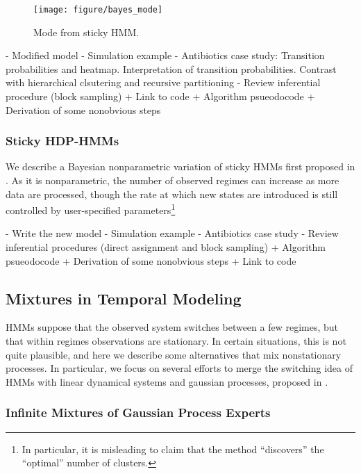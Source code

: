 \documentclass{article}
\begin{document}
\begin{figure}[ht]
  \centering
  \texttt{[image: figure/bayes\_mode]}
  \caption{Mode from sticky HMM. \label{fig:bayes_mode} }
\end{figure}

- Modified model
- Simulation example
- Antibiotics case study: Transition probabilities and heatmap. Interpretation
of transition probabilities. Contrast with hierarchical clsutering and recursive
partitioning
- Review inferential procedure (block sampling)
  + Link to code
  + Algorithm psueodocode
  + Derivation of some nonobvious steps

\subsubsection{Sticky HDP-HMMs}

We describe a Bayesian nonparametric variation of sticky HMMs first proposed in
\citep{fox2008hdp}. As it is nonparametric, the number of observed regimes can
increase as more data are processed, though the rate at which new states are
introduced is still controlled by user-specified parameters\footnote{In
  particular, it is misleading to claim that the method ``discovers'' the
  ``optimal'' number of clusters.}

- Write the new model
- Simulation example
- Antibiotics case study
- Review inferential procedures (direct assignment and block sampling)
  + Algorithm psueodocode
  + Derivation of some nonobvious steps
  + Link to code

\subsection{Mixtures in Temporal Modeling}

HMMs suppose that the observed system switches between a few regimes, but that
within regimes observations are stationary. In certain situations, this is not
quite plausible, and here we describe some alternatives that mix nonstationary
processes. In particular, we focus on several efforts to merge the switching idea of
HMMs with linear dynamical systems and gaussian processes, proposed in
\citep{ghahramani1998variational, rasmussen2002infinite, fox2012multiresolution}.


\subsubsection{Infinite Mixtures of Gaussian Process Experts}
\label{subsec:label}
\end{document}
